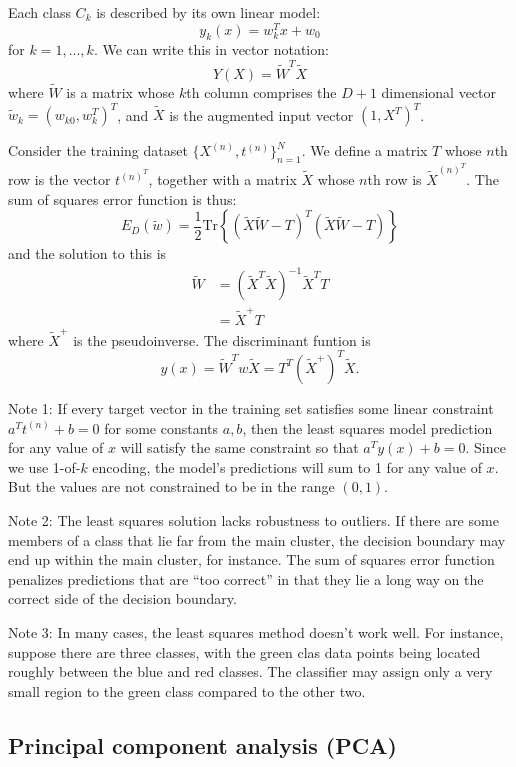 \documentclass[a4paper,12pt]{article}
\begin{document}
Each class $C_k$ is described by its own linear model: 
$$y_k(x) = w_k^T x + w_0 $$
for $k=1, ..., k$. We can write this in vector notation: 
$$Y(X) = \tilde W^T \tilde X$$
where $\tilde W$ is a matrix whose $k$th column comprises the $D+1$ dimensional vector $\tilde w_k = (w_{k0}, w_k^T)^T$, and $\tilde X$ is the augmented input vector $(1, X^T)^T$. 

Consider the training dataset $\{X^{(n)}, t^{(n)}\}_{n=1}^N$. We define a matrix $T$ whose $n$th row is the vector $t^{(n)^T}$, together with a matrix $\tilde X$ whose $n$th row is $\tilde X^{(n)^T}$. The sum of squares error function is thus: 
$$E_D(\tilde w) = \frac{1}{2} \text{Tr}\left\{(\tilde X \tilde W - T)^T (\tilde X \tilde W - T) \right\}$$
and the solution to this is 
\begin{align*}
\tilde W &= (\tilde X^T \tilde X)^{-1} \tilde X^T T \\
         &= \tilde X^+ T
\end{align*}
where $\tilde X^+$ is the pseudoinverse. The discriminant funtion is 
$$y(x) = \tilde W^T w\tilde X = T^T (\tilde X^+)^T \tilde X.$$

Note 1: If every target vector in the training set satisfies some linear constraint $a^T t^{(n)} + b = 0$ for some constants $a, b$, then the least squares model prediction for any value of $x$ will satisfy the same constraint so that $a^T y(x) + b = 0$. Since we use 1-of-$k$ encoding, the model's predictions will sum to 1 for any value of $x$. But the values are not constrained to be in the range $(0, 1)$. 

Note 2: The least squares solution lacks robustness to outliers. If there are some members of a class that lie far from the main cluster, the decision boundary may end up within the main cluster, for instance. The sum of squares error function penalizes predictions that are ``too correct'' in that they lie a long way on the correct side of the decision boundary. 

Note 3: In many cases, the least squares method doesn't work well. For instance, suppose there are three classes, with the green clas data points being located roughly between the blue and red classes. The classifier may assign only a very small region to the green class compared to the other two. 

\subsection{Principal component analysis (PCA)}
\end{document}
